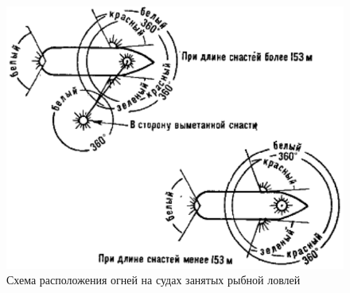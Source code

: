 \documentclass[a4paper, 12pt, twoside, final]{scrbook}
\begin{document}
\begin{figure}[htbp]
   \centering
   \includegraphics{142_Ogni} %
   \caption{Схема расположения огней на судах занятых рыбной ловлей}
   \label{fig:142}
\end{figure}
\end{document}
